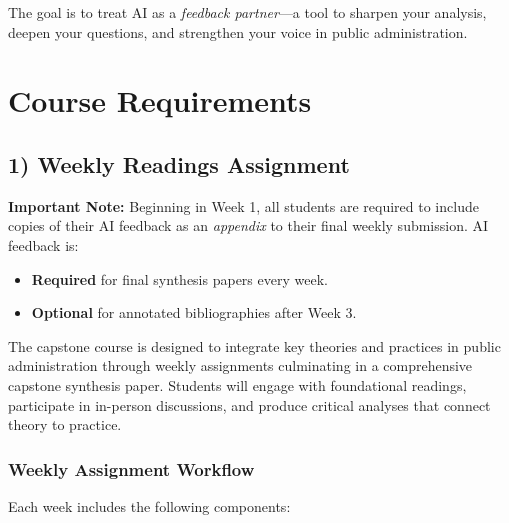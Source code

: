 \documentclass[12pt, letterpaper]{article}
\begin{document}
\noindent The goal is to treat AI as a \textit{feedback partner}---a tool to sharpen your analysis, deepen your questions, and strengthen your voice in public administration.


\section{Course Requirements}

\subsection*{1) Weekly Readings Assignment}

\textbf{Important Note:} Beginning in Week 1, all students are required to include copies of their AI feedback as an \emph{appendix} to their final weekly submission. AI feedback is:
\begin{itemize}
    \item \textbf{Required} for final synthesis papers every week.
    \item \textbf{Optional} for annotated bibliographies after Week 3.
\end{itemize}

The capstone course is designed to integrate key theories and practices in public administration through weekly assignments culminating in a comprehensive capstone synthesis paper. Students will engage with foundational readings, participate in in-person discussions, and produce critical analyses that connect theory to practice.

\subsubsection*{Weekly Assignment Workflow}

Each week includes the following components:
\end{document}
